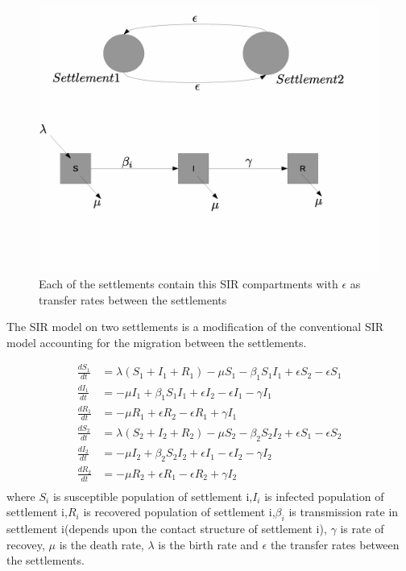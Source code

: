 \documentclass{article}
\begin{document}
\begin{figure}[h!]
  \includegraphics[width=\linewidth]{Figures_Tables/sir_im.eps}
  \caption{Each of the settlements contain this SIR compartments with $\epsilon$ as transfer rates between the settlements}
  \label{fig:SIR_des}
\end{figure}

The SIR model on two settlements is a modification of the conventional
SIR model accounting for the migration between the settlements.

\begin{equation}
\begin{aligned}
\frac{dS_{1}}{dt} &= \lambda(S_{1}+I_{1}+R_{1}) -\mu  S_{1} - \beta_{1} S_{1}I_{1}  + \epsilon S_{2} -\epsilon S_{1} \\
\frac{dI_{1}}{dt} &= -\mu  I_{1} + \beta_{1} S_{1}I_{1}  + \epsilon I_{2} -\epsilon I_{1} -\gamma I_{1} \\
\frac{dR_{1}}{dt} &= -\mu  R_{1} +  \epsilon R_{2} -\epsilon R_{1} +\gamma I_{1} \\
\frac{dS_{2}}{dt} &=\lambda(S_{2}+I_{2}+R_{2}) -\mu  S_{2} - \beta_{2} S_{2}I_{2}  + \epsilon S_{1} -\epsilon S_{2} \\
\frac{dI_{2}}{dt} &= -\mu  I_{2} + \beta_{2} S_{2}I_{2}  + \epsilon I_{1} -\epsilon I_{2} -\gamma I_{2} \\
\frac{dR_{2}}{dt} &= -\mu  R_{2} +  \epsilon R_{1} -\epsilon R_{2} +\gamma I_{2} \\
\end{aligned}
\end{equation}
where $S_{i}$ is susceptible population of settlement i,$I_{i}$ is
infected population of settlement i,$R_{i}$ is recovered population of
settlement i,$\beta_{i}$ is transmission rate in settlement i(depends
upon the contact structure of settlement i), $\gamma$ is rate of
recovey, $\mu$ is the death rate, $\lambda$ is the birth rate and
$\epsilon$ the transfer rates between the settlements.
\end{document}
